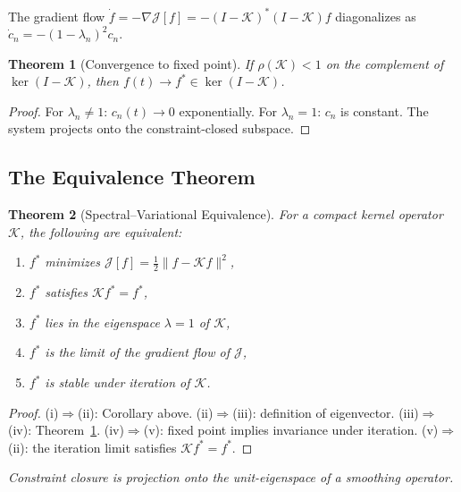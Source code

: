 \documentclass[12pt]{article}
\newtheorem{theorem}{Theorem}[section]
\begin{document}
The gradient flow $\dot{f} = -\nabla\mathcal{J}[f] = -(I-\mathcal{K})^*(I-\mathcal{K})f$
diagonalizes as $\dot{c}_n = -(1-\lambda_n)^2 c_n$.

\begin{theorem}[Convergence to fixed point]
\label{thm:gradflow}
If $\rho(\mathcal{K}) < 1$ on the complement of $\ker(I-\mathcal{K})$, then
$f(t) \to f^* \in \ker(I-\mathcal{K})$.
\end{theorem}

\begin{proof}
For $\lambda_n \neq 1$: $c_n(t) \to 0$ exponentially. For $\lambda_n = 1$:
$c_n$ is constant. The system projects onto the constraint-closed subspace.
\end{proof}

\subsection{The Equivalence Theorem}

\begin{theorem}[Spectral--Variational Equivalence]
\label{thm:sve}
For a compact kernel operator $\mathcal{K}$, the following are equivalent:
\begin{enumerate}[label=(\roman*)]
\item $f^*$ minimizes $\mathcal{J}[f] = \tfrac{1}{2}\|f - \mathcal{K}f\|^2$,
\item $f^*$ satisfies $\mathcal{K}f^* = f^*$,
\item $f^*$ lies in the eigenspace $\lambda = 1$ of $\mathcal{K}$,
\item $f^*$ is the limit of the gradient flow of $\mathcal{J}$,
\item $f^*$ is stable under iteration of $\mathcal{K}$.
\end{enumerate}
\end{theorem}

\begin{proof}
(i)$\Rightarrow$(ii): Corollary above.
(ii)$\Rightarrow$(iii): definition of eigenvector.
(iii)$\Rightarrow$(iv): Theorem~\ref{thm:gradflow}.
(iv)$\Rightarrow$(v): fixed point implies invariance under iteration.
(v)$\Rightarrow$(ii): the iteration limit satisfies $\mathcal{K}f^* = f^*$.
\end{proof}

\begin{center}
\textit{Constraint closure is projection onto the unit-eigenspace of a
smoothing operator.}
\end{center}
\end{document}
